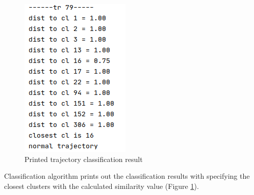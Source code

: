 \begin{figure}
	\vspace{-10pt}
	\centering{}
	\includegraphics[width=\linewidth]{images/classif-res/classif-res-print.png}
	\caption{Printed trajectory classification result}
	\label{fig:classif-res-print}
\end{figure}

Classification algorithm prints out the classification results with specifying the closest clusters with the calculated similarity value (Figure \ref{fig:classif-res-print}).
